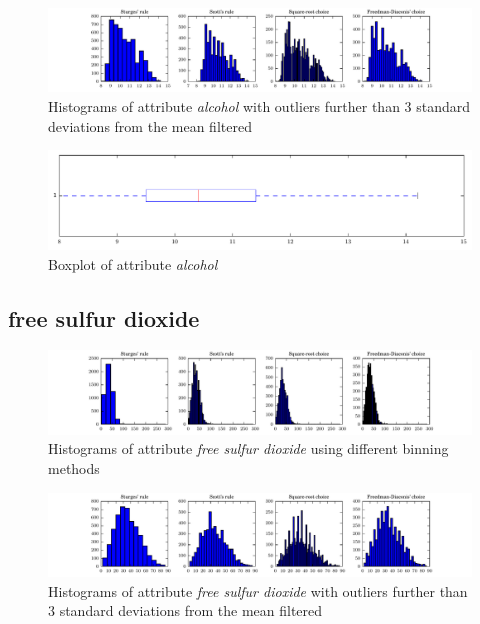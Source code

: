 \documentclass{report}
\begin{document}
\begin{figure}[H]
\includegraphics[width=\textwidth]{histograms/alcohol_filtered.pdf}
\caption{Histograms of attribute \emph{alcohol} with outliers further than 3 standard deviations from the mean filtered}
\end{figure}

\begin{figure}[H]
\includegraphics[width=\textwidth]{boxplots/alcohol.pdf}
\caption{Boxplot of attribute \emph{alcohol}}\end{figure}

\newpage\subsection{free sulfur dioxide}
\begin{figure}[H]
\includegraphics[width=\textwidth]{histograms/free_sulfur_dioxide.pdf}
\caption{Histograms of attribute \emph{free sulfur dioxide} using different binning methods}\end{figure}

\begin{figure}[H]
\includegraphics[width=\textwidth]{histograms/free_sulfur_dioxide_filtered.pdf}
\caption{Histograms of attribute \emph{free sulfur dioxide} with outliers further than 3 standard deviations from the mean filtered}
\end{figure}
\end{document}
